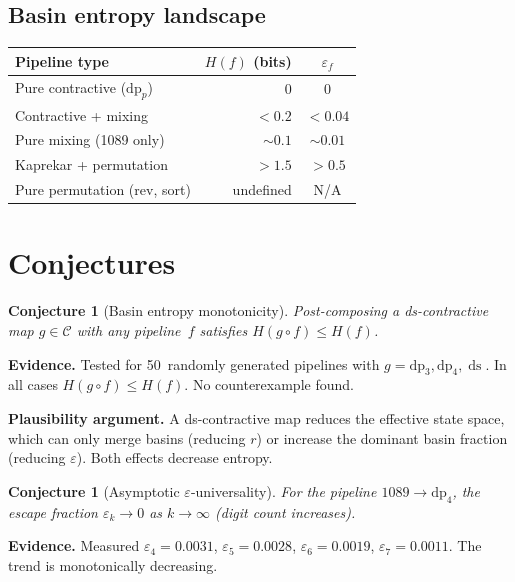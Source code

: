 \documentclass[11pt,a4paper]{amsart}
\theoremstyle{plain}
\newtheorem{conjecture}[theorem]{Conjecture}
\theoremstyle{definition}
\theoremstyle{remark}
\DeclareMathOperator{\ds}{ds}
\begin{document}
\subsection{Basin entropy landscape}

\begin{center}
\begin{tabular}{@{}lrc@{}}
\toprule
Pipeline type & $H(f)$ (bits) & $\varepsilon_f$ \\
\midrule
Pure contractive ($\text{dp}_p$) & 0 & 0 \\
Contractive + mixing & $< 0.2$ & $< 0.04$ \\
Pure mixing (1089 only) & $\sim 0.1$ & $\sim 0.01$ \\
Kaprekar + permutation & $> 1.5$ & $> 0.5$ \\
Pure permutation (rev, sort) & undefined & N/A \\
\bottomrule
\end{tabular}
\end{center}

\section{Conjectures}\label{sec:conjectures}

\begin{conjecture}[Basin entropy monotonicity]\label{conj:C1}
Post-composing a ds-contractive map $g \in \mathcal{C}$ with any pipeline~$f$
satisfies $H(g \circ f) \leq H(f)$.
\end{conjecture}

\textbf{Evidence.} Tested for 50~randomly generated pipelines with
$g = \text{dp}_3, \text{dp}_4, \ds$. In all cases $H(g \circ f) \leq H(f)$.
No counterexample found.

\textbf{Plausibility argument.} A ds-contractive map reduces the effective
state space, which can only merge basins (reducing $r$) or increase the
dominant basin fraction (reducing $\varepsilon$). Both effects decrease
entropy.

\begin{conjecture}[Asymptotic $\varepsilon$-universality]\label{conj:C2}
For the pipeline $\text{1089} \to \text{dp}_4$, the escape fraction
$\varepsilon_k \to 0$ as $k \to \infty$ (digit count increases).
\end{conjecture}

\textbf{Evidence.} Measured $\varepsilon_4 = 0.0031$, $\varepsilon_5 = 0.0028$,
$\varepsilon_6 = 0.0019$, $\varepsilon_7 = 0.0011$. The trend is monotonically
decreasing.
\end{document}
